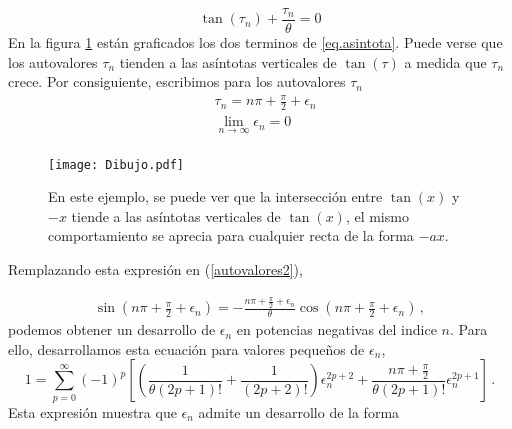 \begin{equation}
    \tan (\tau _n) + \frac{\tau _n}{\theta} = 0
    \label{eq.asintota}
\end{equation}
En la figura \ref{fig:Dibujo1} están graficados los dos terminos de \ref{eq.asintota}. Puede verse que los autovalores $\tau _n$ tienden a las asíntotas verticales de $ \tan ( \tau ) $ a medida que $\tau _n$ crece. Por consiguiente, escribimos para los autovalores $\tau _n$ 
\begin{equation}
\begin{aligned}
    & \tau _n = n \pi + \frac{\pi}{2} + \epsilon _n \\[5pt]
    & \lim \limits_{ n \rightarrow \infty} \epsilon _n = 0 \\
\end{aligned}
\label{eq.mu}
\end{equation}
\begin{figure}
    \centering
    \texttt{[image: Dibujo.pdf]}
    \caption{En este ejemplo, se puede ver que la intersección entre $ \tan(x)$ y $-x$ tiende a las asíntotas verticales de $\tan (x) $, el mismo comportamiento se aprecia para cualquier recta de la forma $- a x$.}
    \label{fig:Dibujo1}
\end{figure}
Remplazando esta expresión en (\ref{autovalores2}),

\begin{equation}
\begin{aligned}
    \sin \left( n \pi + \frac{\pi}{2} + \epsilon _n \right) = -
    \frac{n \pi + \frac{\pi}{2} + \epsilon _n}{\theta} \cos \left( n \pi + \frac{\pi}{2} + \epsilon _n\right)
    \, ,
\end{aligned}
\end{equation}
podemos obtener un desarrollo de $\epsilon _n$ en potencias negativas del indice $n$. Para ello, desarrollamos esta ecuación para valores pequeños de $\epsilon _n$,   
\begin{equation}
    1 = 
    \sum _{p=0} ^{\infty} (-1) ^p     \left[
   	\left( \frac{1}{\theta (2p+1)!  } + \frac{1}{(2p+2)!} \right) \epsilon _n ^{2p+2 } +
  	\frac{n \pi + \frac{\pi}{2}}{\theta (2p+1)! }   \epsilon _n ^{2p+1} 			\right]
  	\, .
\label{igualdad epsilon}
\end{equation}
Esta expresión muestra que $\epsilon _n$ admite un desarrollo de la forma

